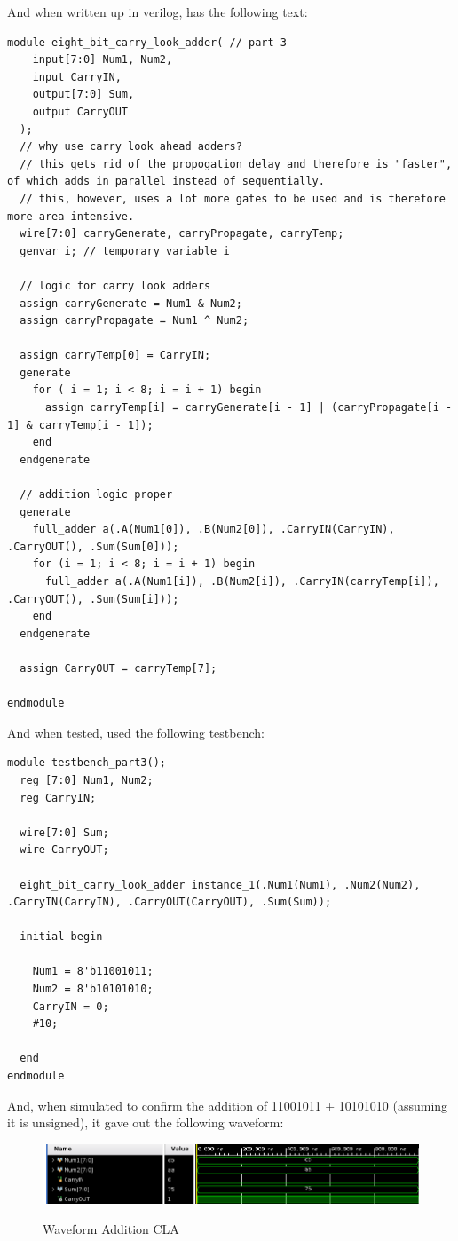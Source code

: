 And when written up in verilog, has the following text:
\begin{lstlisting}[label={label}, style=Verilog]
module eight_bit_carry_look_adder( // part 3
    input[7:0] Num1, Num2,
    input CarryIN,
    output[7:0] Sum,
    output CarryOUT
  );
  // why use carry look ahead adders?
  // this gets rid of the propogation delay and therefore is "faster", of which adds in parallel instead of sequentially.
  // this, however, uses a lot more gates to be used and is therefore more area intensive.
  wire[7:0] carryGenerate, carryPropagate, carryTemp;
  genvar i; // temporary variable i
  
  // logic for carry look adders
  assign carryGenerate = Num1 & Num2;
  assign carryPropagate = Num1 ^ Num2;

  assign carryTemp[0] = CarryIN;
  generate
    for ( i = 1; i < 8; i = i + 1) begin
      assign carryTemp[i] = carryGenerate[i - 1] | (carryPropagate[i - 1] & carryTemp[i - 1]);
    end
  endgenerate

  // addition logic proper
  generate
    full_adder a(.A(Num1[0]), .B(Num2[0]), .CarryIN(CarryIN), .CarryOUT(), .Sum(Sum[0]));
    for (i = 1; i < 8; i = i + 1) begin
      full_adder a(.A(Num1[i]), .B(Num2[i]), .CarryIN(carryTemp[i]), .CarryOUT(), .Sum(Sum[i]));
    end
  endgenerate
  
  assign CarryOUT = carryTemp[7];

endmodule
\end{lstlisting}

And when tested, used the following testbench:
\begin{lstlisting}[label={label}, style=Verilog]
module testbench_part3();
  reg [7:0] Num1, Num2;
  reg CarryIN;

  wire[7:0] Sum;
  wire CarryOUT;

  eight_bit_carry_look_adder instance_1(.Num1(Num1), .Num2(Num2), .CarryIN(CarryIN), .CarryOUT(CarryOUT), .Sum(Sum));

  initial begin

    Num1 = 8'b11001011; 
    Num2 = 8'b10101010; 
    CarryIN = 0;
    #10;

  end
endmodule
\end{lstlisting}

And, when simulated to confirm the addition of 11001011 + 10101010 (assuming it is unsigned), it gave out the following waveform:
\begin{figure}[!htbp]
    \centering
    \caption{Waveform Addition CLA}
    \includegraphics[width=1\textwidth]{part-3-waveform.png}
    \label{Waveform Part 3 A}
\end{figure}

